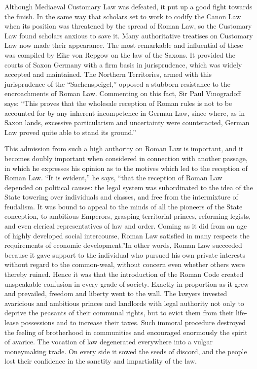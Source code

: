 \documentclass{book}
\begin{document}
Although Mediaeval Customary Law was defeated, it put up a good fight towards the finish. In the same way that scholars set to work to codify the Canon Law when its position was threatened by the spread of Roman Law, so the Customary Law found scholars anxious to save it. Many authoritative treatises on Customary Law now made their appearance. The most remarkable and influential of these was compiled by Eike von Repgow on the law of the Saxons. It provided the courts of Saxon Germany with a firm basis in jurisprudence, which was widely accepted and maintained. The Northern Territories, armed with this jurisprudence of the “Sachenspeigel,” opposed a stubborn resistance to the encroachments of Roman Law. Commenting on this fact, Sir Paul Vinogradoff says: “This proves that the wholesale reception of Roman rules is not to be accounted for by any inherent incompetence in German Law, since where, as in Saxon lands, excessive particularism and uncertainty were counteracted, German Law proved quite able to stand its ground.”\footnotemark[7]

This admission from such a high authority on Roman Law is important, and it becomes doubly important when considered in connection with another passage, in which he expresses his opinion as to the motives which led to the reception of Roman Law. “It is evident,” he says, “that the reception of Roman Law depended on political causes: the legal system was subordinated to the idea of the State towering over individuals and classes, and free from the intermixture of feudalism. It was bound to appeal to the minds of all the pioneers of the State conception, to ambitious Emperors, grasping territorial princes, reforming legists, and even clerical representatives of law and order. Coming as it did from an age of highly developed social intercourse, Roman Law satisfied in many respects the requirements of economic development.”\footnotemark[8] In other words, Roman Law succeeded because it gave support to the individual who pursued his own private interests without regard to the common-weal, without concern even whether others were thereby ruined. Hence it was that the introduction of the Roman Code created unspeakable confusion in every grade of society. Exactly in proportion as it grew and prevailed, freedom and liberty went to the wall. The lawyers invested avaricious and ambitious princes and landlords with legal authority not only to deprive the peasants of their communal rights, but to evict them from their life-lease possessions and to increase their taxes. Such immoral procedure destroyed the feeling of brotherhood in communities and encouraged enormously the spirit of avarice. The vocation of law degenerated everywhere into a vulgar moneymaking trade. On every side it sowed the seeds of discord, and the people lost their confidence in the sanctity and impartiality of the law.
\end{document}

